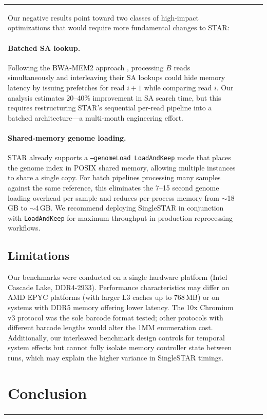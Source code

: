 \documentclass[11pt,twocolumn]{article}
\begin{document}
\begin{table}[t]
\begin{tabular}{@{}lrrr@{}}
Our negative results point toward two classes of high-impact optimizations that would require more fundamental changes to STAR:

\paragraph{Batched SA lookup.} Following the BWA-MEM2 approach \citep{vasimuddin2019efficient}, processing $B$ reads simultaneously and interleaving their SA lookups could hide memory latency by issuing prefetches for read $i+1$ while comparing read $i$. Our analysis estimates 20--40\% improvement in SA search time, but this requires restructuring STAR's sequential per-read pipeline into a batched architecture---a multi-month engineering effort.

\paragraph{Shared-memory genome loading.} STAR already supports a \texttt{--genomeLoad LoadAndKeep} mode that places the genome index in POSIX shared memory, allowing multiple instances to share a single copy. For batch pipelines processing many samples against the same reference, this eliminates the 7--15 second genome loading overhead per sample and reduces per-process memory from $\sim$18\,GB to $\sim$4\,GB. We recommend deploying SingleSTAR in conjunction with \texttt{LoadAndKeep} for maximum throughput in production reprocessing workflows.

\subsection{Limitations}

Our benchmarks were conducted on a single hardware platform (Intel Cascade Lake, DDR4-2933). Performance characteristics may differ on AMD EPYC platforms (with larger L3 caches up to 768\,MB) or on systems with DDR5 memory offering lower latency. The 10x Chromium v3 protocol was the sole barcode format tested; other protocols with different barcode lengths would alter the 1MM enumeration cost. Additionally, our interleaved benchmark design controls for temporal system effects but cannot fully isolate memory controller state between runs, which may explain the higher variance in SingleSTAR timings.

\section{Conclusion}


\end{tabular}
\end{table}
\end{document}
